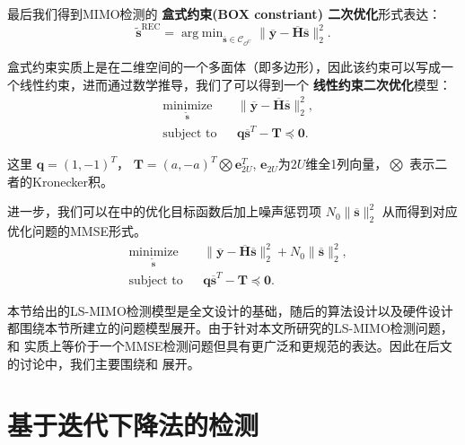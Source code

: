 \documentclass[bachelor,oneside]{seuthesis} %
\begin{document}
\begin{spacing}{1.5}
\begin{Main}
最后我们得到MIMO检测的 {\bf 盒式约束(BOX constriant) 二次优化}形式表达：
\begin{equation}
\tilde { {\mathbf {s}}}^{\text {REC}} = \mathop {\mathrm {arg\;min}} _{\overline{\mathbf {s}}\in \mathcal {C}_{\mathcal{O} ^U}} \| \overline{\mathbf {y}}- \overline{\mathbf {H}}\overline {\mathbf {s}}\|_{2}^{2}.
\end{equation}\label{eq:boxc}

盒式约束实质上是在二维空间的一个多面体（即多边形），因此该约束可以写成一个线性约束，进而通过数学推导，我们了可以得到一个 {\bf 线性约束二次优化}模型：
\begin{equation}\label{eqn:bp}
\begin{aligned}
& \underset{\tilde{\mathbf{s}}}{\text{minimize}}
& & \| \overline{\mathbf {y}}- \overline{\mathbf {H}}\overline {\mathbf {s}}\|_{2}^{2}, \\
& \text{subject to}
& &\mathbf{q}\overline {\mathbf {s}}^T-\mathbf{T}\preceq \mathbf{0} .
\end{aligned}
\end{equation}

这里 $\mathbf{q}=(1,-1)^T$，  $\mathbf{T}=(a,-a)^T\bigotimes \mathbf{e}_{2U}^T$, $\mathbf{e}_{2U}$为$2U$维全1列向量，$\bigotimes$ 表示二者的Kronecker积。

进一步，我们可以在中的优化目标函数后加上噪声惩罚项 $N_{0}\| \overline {\mathbf {{s}}}\|^{2}_{2}$ 从而得到对应优化问题的MMSE形式。
\begin{equation}\label{eqn:bpmmse}
\begin{aligned}
& \underset{\tilde{\mathbf{s}}}{\text{minimize}}
& & \| \overline{\mathbf {y}}- \overline{\mathbf {H}}\overline {\mathbf {s}}\|_{2}^{2}+N_{0}\| \overline {\mathbf {{s}}}\|^{2}_{2}, \\
& \text{subject to}
& &\mathbf{q}\overline {\mathbf {s}}^T-\mathbf{T}\preceq \mathbf{0} .
\end{aligned}
\end{equation}


本节给出的LS-MIMO检测模型是全文设计的基础，随后的算法设计以及硬件设计都围绕本节所建立的问题模型展开。由于针对本文所研究的LS-MIMO检测问题，和 实质上等价于一个MMSE检测问题但具有更广泛和更规范的表达。因此在后文的讨论中，我们主要围绕和 展开。
\chapter{基于迭代下降法的检测}\label{chapter:3}


\end{Main}
\end{spacing}
\end{document}

